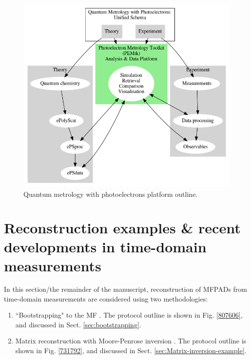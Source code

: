 \documentclass[10pt]{article}
\begin{document}

\begin{figure}[]
\begin{center}
\includegraphics[width=\textwidth,height=\dimexpr\textheight-4\baselineskip-\abovecaptionskip-\belowcaptionskip\relax,keepaspectratio]{figures/QM_unified_schema_wrapped_280820-gv.png}
\caption{Quantum metrology with photoelectrons platform outline.\label{239231}}
\end{center}
\end{figure}

\section{Reconstruction examples \& recent developments in time-domain measurements\label{sec:Recon}}

In this section/the remainder of the manuscript, reconstruction of MFPADs from time-domain measurements are considered using two methodologies:

\begin{enumerate}
\item ``Bootstrapping" to the MF \cite{hockett2018QMP1,hockett2018QMP2,marceau2017MolecularFrameReconstruction}. The protocol outline is shown in Fig. \ref{807606}, and discussed in Sect. \ref{sec:bootstrapping}.
\item Matrix reconstruction with Moore-Penrose inversion \cite{gregory2021MolecularFramePhotoelectron}. The protocol outline is shown in Fig. \ref{731792}, and discussed in Sect. \ref{sec:Matrix-inversion-example}.
\end{enumerate}
\end{document}
